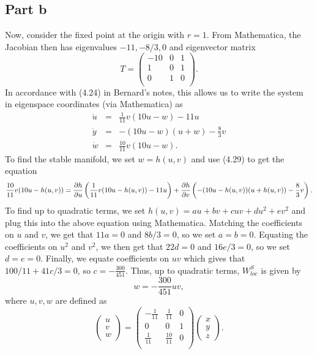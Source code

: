 \documentclass{article}
\begin{document}
\subsection{Part b}
Now, consider the fixed point at the origin with $r=1$. From Mathematica, the Jacobian then has eigenvalues $-11,-8/3,0$ and eigenvector matrix 
\[
T = \left(
\begin{array}{ccc}
	-10 & 0 & 1 \\
	1 & 0 & 1 \\
	0 & 1 & 0 \\
\end{array}
\right).
\]
In accordance with (4.24) in Bernard's notes, this allows us to write the system in eigenspace coordinates (via Mathematica) as 
\begin{eqnarray*} 
	\dot u &=& \frac{1}{11}v(10u-w)-11u  \\
	\dot y &=& -(10u-w)(u+w)-\frac{8}{3}v\\
	\dot w &=& \frac{10}{11}v(10u-w).
\end{eqnarray*}
To find the stable manifold, we set $w=h(u,v)$ and use (4.29) to get the equation
\[
\frac{10}{11}v(10u-h(u,v))=\frac{\partial h}{\partial u}\left(\frac{1}{11}v(10u-h(u,v))-11u\right)+\frac{\partial h}{\partial v}\left(-(10u-h(u,v))(u+h(u,v))-\frac{8}{3}v\right).
\]
To find up to quadratic terms, we set $h(u,v)=au+bv+cuv+du^2+ev^2$ and plug this into the above equation using Mathematica. Matching the coefficients on $u$ and $v$, we get that $11a=0$ and $8b/3=0$, so we set $a=b=0$. Equating the coefficients on $u^2$ and $v^2$, we then get that $22d=0$ and $16e/3=0$, so we set $d=e=0$. Finally, we equate coefficients on $uv$ which gives that $100/11+41c/3=0$, so $c=-\frac{300}{451}$. Thus, up to quadratic terms, $W^S_{loc}$ is given by 
\[
w=-\frac{300}{451}uv,
\]
where $u,v,w$ are defined as 
\[
\begin{pmatrix}
	u\\v\\w
\end{pmatrix}=\left(
\begin{array}{ccc}
	-\frac{1}{11} & \frac{1}{11} & 0 \\
	0 & 0 & 1 \\
	\frac{1}{11} & \frac{10}{11} & 0 \\
\end{array}
\right)\begin{pmatrix}
	x\\y\\z
\end{pmatrix}.
\]
\end{document}
